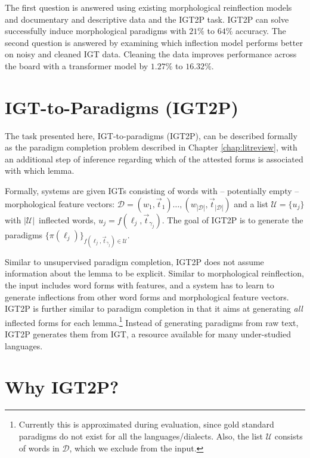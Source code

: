 The first question is answered using existing morphological reinflection models and documentary and descriptive data and the IGT2P task. IGT2P can solve successfully induce morphological paradigms with $21\%$ to $64\%$ accuracy. The second question is answered by examining which inflection model performs better on noisy and cleaned IGT data. Cleaning the data improves performance across the board with a transformer model by $1.27\%$ to $16.32\%$. 


\section{IGT-to-Paradigms (IGT2P)}

The task presented here, IGT-to-paradigms (IGT2P), can be described formally as the paradigm completion problem described in Chapter \ref{chap:litreview}, with an additional step of inference regarding which of the attested forms is associated with which lemma. 

Formally, systems are given IGTs consisting of words with -- potentially empty -- morphological feature vectors: $\mathcal{D}=(w_1,\vec{t}_1) \dots, (w_{|\mathcal{D}|}, \vec{t}_{|\mathcal{D}|})$ and a list $\mathcal{U} = \{u_j\}$ with $|\mathcal{U}|$~inflected words, $u_j = f(\ell_j, \vec{t}_{\gamma_j})$. The goal of IGT2P is to generate the paradigms 
$\{\pi(\ell_j)\}_{f(\ell_j, \vec{t}_{\gamma_j})\in\mathcal{U}}$.

Similar to unsupervised paradigm completion, IGT2P does not assume information about the lemma to be explicit. Similar to morphological reinflection, the input includes word forms with features, and a system has to learn to generate inflections from other word forms and morphological feature vectors. 
IGT2P is further similar to paradigm completion in that it aims at generating \textit{all} inflected forms for each lemma.\footnote{Currently this is approximated during evaluation, since gold standard paradigms do not exist for all the languages/dialects. Also, the list $\mathcal{U}$ consists of words in $\mathcal{D}$, which we exclude from the input.} Instead of generating paradigms from raw text, IGT2P generates them from IGT, a resource available for many under-studied languages.


\section{Why IGT2P?}

